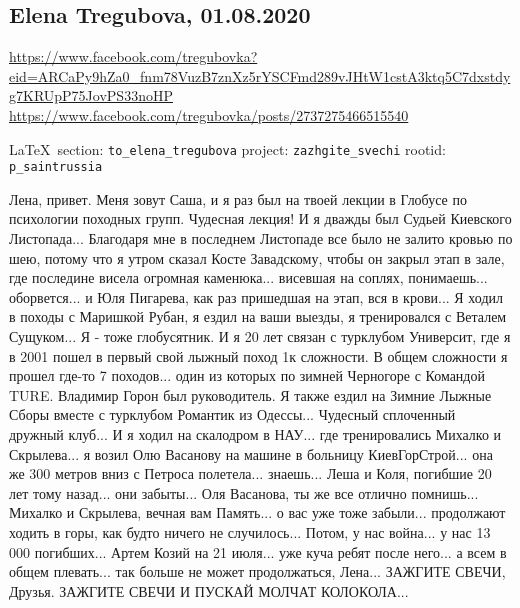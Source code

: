  
 
\subsection{Elena Tregubova, 01.08.2020}
\url{https://www.facebook.com/tregubovka?eid=ARCaPy9hZa0_fnm78VuzB7znXz5rYSCFmd289vJHtW1cstA3ktq5C7dxstdyg7KRUpP75JovPS33noHP}
\url{https://www.facebook.com/tregubovka/posts/2737275466515540}
  
\vspace{0.5cm}
{\small\LaTeX~section: \verb|to_elena_tregubova| project: \verb|zazhgite_svechi| rootid: \verb|p_saintrussia|}
\vspace{0.5cm}
  
Лена, привет. Меня зовут Саша, и я раз был на твоей лекции в Глобусе по
психологии походных групп. Чудесная лекция! И я дважды был Судьей Киевского
Листопада... Благодаря мне в последнем Листопаде все было не залито кровью по
шею, потому что я утром сказал Косте Завадскому, чтобы он закрыл этап в зале,
где последине висела огромная каменюка... висевшая на соплях, понимаешь...
оборвется... и Юля Пигарева, как раз пришедшая на этап, вся в крови... Я ходил
в походы с Маришкой Рубан, я ездил на ваши выезды, я тренировался с Веталем
Сущуком... Я - тоже глобусятник. И я 20 лет связан с турклубом Университ, где я
в 2001 пошел в первый свой лыжный поход 1к сложности. В общем сложности я
прошел где-то 7 походов... один из которых по зимней Черногоре с Командой TURE.
Владимир Горон был руководитель. Я также ездил на Зимние Лыжные Сборы вместе с
турклубом Романтик из Одессы... Чудесный сплоченный дружный клуб... И я ходил
на скалодром в НАУ... где тренировались Михалко и Скрылева... я возил Олю
Васанову на машине в больницу КиевГорСтрой... она же 300 метров вниз с Петроса
полетела... знаешь... Леша и Коля, погибшие 20 лет тому назад... они забыты...
Оля Васанова, ты же все отлично помнишь... Михалко и Скрылева, вечная вам
Память... о вас уже тоже забыли... продолжают ходить в горы, как будто ничего
не случилось... Потом, у нас война... у нас 13 000 погибших... Артем Козий на
21 июля... уже куча ребят после него... а всем в общем плевать... так больше не
может продолжаться, Лена... ЗАЖГИТЕ СВЕЧИ, Друзья. ЗАЖГИТЕ СВЕЧИ И ПУСКАЙ
МОЛЧАТ КОЛОКОЛА...
